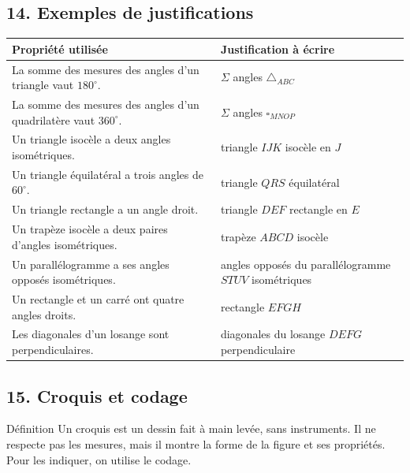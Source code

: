 \vspace{14pt}
\subsection*{14. Exemples de justifications}

\def\arraystretch{1.8}\setlength{\extrarowheight}{3pt}
\small
\begin{tabularx}{\linewidth}{|>{\raggedright\arraybackslash}X|>{\raggedright\arraybackslash}m{6.7cm}|}
\hline
\cellcolor{themeColor!30}\textbf{Propriété utilisée} & \cellcolor{themeColor!30}\textbf{Justification à écrire}\\\hline
La somme des mesures des angles d'un triangle vaut $180^\circ$. & $\Sigma$ angles $\triangle_{ABC}$\\\hline
La somme des mesures des angles d'un quadrilatère vaut $360^\circ$. & $\Sigma$ angles $\square_{MNOP}$\\\hline
Un triangle isocèle a deux angles isométriques. & triangle $IJK$ isocèle en $J$\\\hline
Un triangle équilatéral a trois angles de $60^\circ$. & triangle $QRS$ équilatéral\\\hline
Un triangle rectangle a un angle droit. & triangle $DEF$ rectangle en $E$\\\hline
Un trapèze isocèle a deux paires d'angles isométriques. & trapèze $ABCD$ isocèle\\\hline
Un parallélogramme a ses angles opposés isométriques. & angles opposés du parallélogramme $STUV$ isométriques\\\hline
Un rectangle et un carré ont quatre angles droits. & rectangle $EFGH$\\\hline
Les diagonales d'un losange sont perpendiculaires. & diagonales du losange $DEFG$ perpendiculaire\\\hline
\end{tabularx}
\normalsize
\def\arraystretch{1}\setlength{\extrarowheight}{0pt}

\vfill
\subsection*{15. Croquis et codage}

\begin{regle}{Définition}
Un \textcolor{themeColor}{croquis} est un dessin fait à main levée, sans instruments. Il ne respecte pas les mesures, mais il montre la \textcolor{themeColor}{forme} de la figure et ses \textcolor{themeColor}{propriétés}. Pour les indiquer, on utilise le \textcolor{themeColor}{codage}.
\end{regle}

